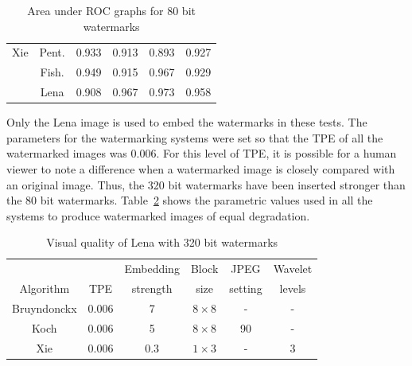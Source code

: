 \documentclass[10pt,twocolumn]{article}
\begin{document}
\begin{table}[!ht]
\begin{center}
\begin{tabular}{|c||c||c|c|c|c|}
                Xie     &               Pent.       & 0.933   & 0.913        & 0.893         & 0.927         \\ \cline{2-6}
                        &               Fish.     & 0.949   & 0.915        & 0.967         & 0.929         \\ \cline{2-6}
                        &               Lena            & 0.908   & 0.967        & 0.973         & 0.958         \\ \hline

                \end{tabular}
		\caption{Area under ROC graphs for 80 bit watermarks}
                \label{bkzROCBKX}
        \end{center}
\end{table}
\normalsize
Only the Lena image is used to embed the watermarks in these tests.
The parameters for the watermarking systems were set so that the TPE of all the 
watermarked images was 0.006. 
For this level of TPE, it is possible for a human viewer to note a difference when a watermarked image
is closely compared with an original image. Thus, the 320 bit watermarks have been inserted stronger
than the 80 bit watermarks.
Table~\ref{tab:3schemes320BKX}
shows the parametric values used in all the systems to produce watermarked images of equal degradation.
\begin{table}[!htb]
\footnotesize
        \begin{center}
                \begin{tabular}{|c|c|c|c|c|c|} \hline
				&		& Embedding	& Block		& JPEG 		& Wavelet \\
                Algorithm       & TPE           & strength    	& size    	& setting	& levels	 \\ \hline
                Bruyndonckx     & 0.006         & 7             & $8\times 8$   & -		& - 		\\ \hline
                Koch            & 0.006         & 5             & $8\times 8$   & 90		& - 		\\ \hline
                Xie             & 0.006         & 0.3           & $1\times 3$   & -		& 3 		\\ \hline
                \end{tabular}
		\caption{Visual quality of Lena with 320 bit watermarks}
                \label{tab:3schemes320BKX}
        \end{center}
\end{table}
\end{document}
